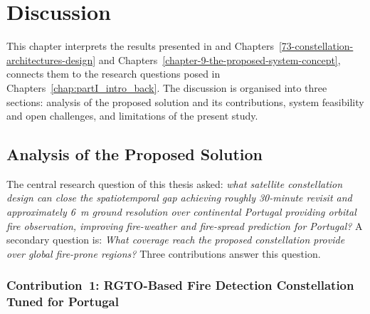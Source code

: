 \chapter{Discussion}\label{chapter-10-discussion}

This chapter interprets the results presented in and Chapters~\ref{73-constellation-architectures-design} and Chapters~\ref{chapter-9-the-proposed-system-concept}, connects them to the research questions posed in Chapters~\ref{chap:partI_intro_back}. The discussion is organised into three sections: analysis of the proposed solution and its contributions, system feasibility and open challenges, and limitations of the present study.

\section{Analysis of the Proposed Solution}\label{sec:discussion-analysis}

The central research question of this thesis asked: \emph{what satellite constellation design can close the spatiotemporal gap achieving roughly 30-minute revisit and approximately 6~m ground resolution over continental Portugal providing orbital fire observation, improving fire-weather and fire-spread prediction for Portugal?} A secondary question is: \emph{What coverage reach the proposed constellation provide over global fire-prone regions?} Three contributions answer this question.

\subsection{Contribution~1: RGTO-Based Fire Detection Constellation Tuned for Portugal}

